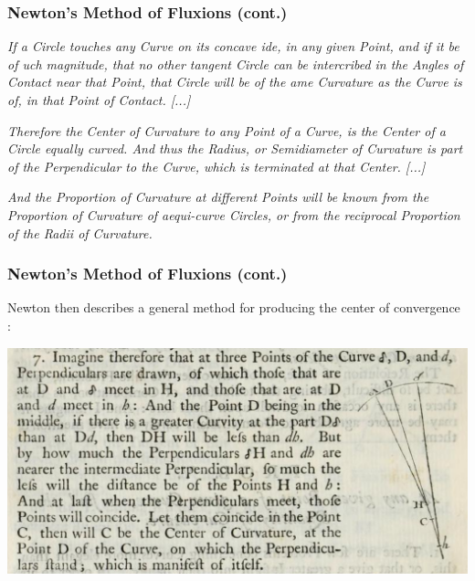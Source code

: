 \documentclass[handout]{beamer}
\theoremstyle{definition}
\begin{document}
\begin{frame}
    \frametitle{Newton's Method of Fluxions (cont.)}

    \textit{If a Circle touches any Curve on its concave \textesh{}ide, in any given Point,
        and if it be of \textesh{}uch magnitude, that no other tangent Circle can be
        inter\textesh{}cribed in the Angles of Contact near that Point, that Circle
        will be of the \textesh{}ame Curvature as the Curve is of, in that Point of
        Contact. [...]
    }

    \textit{Therefore the Center of Curvature to any Point of a Curve, is the Center of a
        Circle equally curved. And thus the Radius, or Semidiameter of Curvature is
        part of the Perpendicular to the Curve, which is terminated at that Center.
        [...]
    }

    \textit{And the Proportion of Curvature at different Points will be known from
        the Proportion of Curvature of aequi-curve Circles, or from the reciprocal
        Proportion of the Radii of Curvature.
    }
\end{frame}

\begin{frame}
    \frametitle{Newton's Method of Fluxions (cont.)}

    Newton then describes a general method for producing the center of convergence \cite{newton}:

    \includegraphics[width=\textwidth]{images/newton-center-construction.png}

\end{frame}
\end{document}

